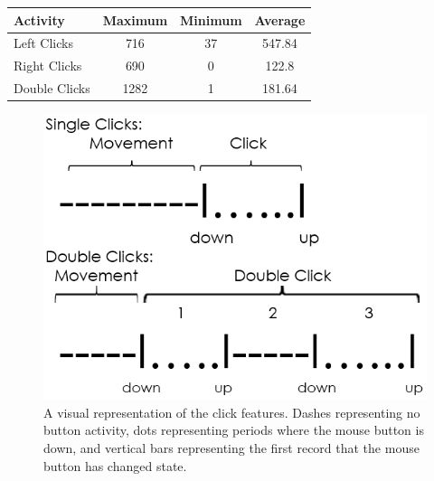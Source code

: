 \documentclass[conference]{IEEEtran}
\begin{document}
\begin{table}
\centering
{}
\label{tbl:samples}
\def\arraystretch{1.5}
\begin{tabular}{l c c c}
\textbf{Activity} &\textbf{Maximum} & \textbf{Minimum} & \textbf{Average} \\
\hline
Left Clicks	& 716 & 37 & 547.84 \\
Right Clicks	& 690 & 0 & 122.8 \\
Double Clicks	& 1282 & 1 & 181.64 \\
\end{tabular}
\end{table}


\begin{figure}
  \includegraphics[width=1\linewidth]{clickDiag}
  \caption{A visual representation of the click features. Dashes representing no button activity, dots representing periods where the mouse button is down, and vertical bars representing the first record that the mouse button has changed state.  \label{fig:visualdefinition}}
\end{figure}
\end{document}
